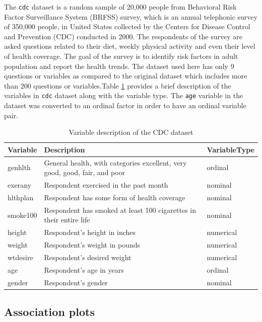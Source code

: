 The \texttt{cdc} dataset is a random sample of 20,000 people from
Behavioral Risk Factor Surveillance System (BRFSS) survey, which is an
annual telephonic survey of 350,000 people, in United States collected
by the Centers for Disease Control and Prevention (CDC) conducted in
2000. The respondents of the survey are asked questions related to their
diet, weekly physical activity and even their level of health coverage.
The goal of the survey is to identify risk factors in adult population
and report the health trends. The dataset used here has only 9 questions
or variables as compared to the original dataset which includes more
than 200 questions or variables.Table \ref{tab:cdcdata} provides a brief
description of the variables in \texttt{cdc} dataset along with the
variable type. The \texttt{age} variable in the dataset was converted to
an ordinal factor in order to have an ordinal variable pair.

\begin{Schunk}
\begin{table}

\caption{\label{tab:cdcdata}Variable description of the CDC dataset}
\centering
\begin{tabular}[t]{lll}
\toprule
Variable & Description & VariableType\\
\midrule
genhlth & General health, with categories excellent, very good, good, fair, and poor & ordinal\\
exerany & Respondent exercised in the past month & nominal\\
hlthplan & Respondent has some form of health coverage & nominal\\
smoke100 & Respondent has smoked at least 100 cigarettes in their entire life & nominal\\
height & Respondent's height in inches & numerical\\
\addlinespace
weight & Respondent's weight in pounds & numerical\\
wtdesire & Respondent's desired weight & numerical\\
age & Respondent's age in years & ordinal\\
gender & Respondent's gender & nominal\\
\bottomrule
\end{tabular}
\end{table}

\end{Schunk}

\hypertarget{association-plots}{%
\subsection{Association plots}\label{association-plots}}


